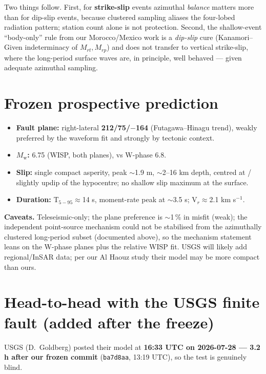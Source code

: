 \documentclass[11pt]{article}
\newcommand{\Mw}{$M_{\mathrm w}$}
\begin{document}
Two things follow. First, for \textbf{strike-slip} events azimuthal \emph{balance} matters more
than for dip-slip events, because clustered sampling aliases the four-lobed radiation pattern;
station count alone is not protection. Second, the shallow-event ``body-only'' rule from our
Morocco/Mexico work is a \emph{dip-slip} cure (Kanamori--Given indeterminacy of $M_{rt},M_{rp}$)
and does not transfer to vertical strike-slip, where the long-period surface waves are, in
principle, well behaved --- given adequate azimuthal sampling.

\section{Frozen prospective prediction}
\begin{itemize}
\item \textbf{Fault plane:} right-lateral \textbf{212/75/$-$164} (Futagawa--Hinagu trend), weakly
preferred by the waveform fit and strongly by tectonic context.
\item \textbf{\Mw:} 6.75 (WISP, both planes), vs W-phase 6.8.
\item \textbf{Slip:} single compact asperity, peak $\sim$1.9 m, $\sim$2--16 km depth, centred at /
slightly updip of the hypocentre; no shallow slip maximum at the surface.
\item \textbf{Duration:} T$_{5-95}\approx$14 s, moment-rate peak at $\sim$3.5 s; V$_r\approx$2.1
km s$^{-1}$.
\end{itemize}

\textbf{Caveats.} Teleseismic-only; the plane preference is $\sim$1\,\% in misfit (weak); the
independent point-source mechanism could not be stabilised from the azimuthally clustered
long-period subset (documented above), so the mechanism statement leans on the W-phase planes plus
the relative WISP fit. USGS will likely add regional/InSAR data; per our Al Haouz study their model
may be more compact than ours.

\section{Head-to-head with the USGS finite fault (added after the freeze)}
USGS (D.~Goldberg) posted their model at \textbf{16:33 UTC on 2026-07-28 --- 3.2 h after our
frozen commit} (\texttt{ba7d8aa}, 13:19 UTC), so the test is genuinely blind.
\end{document}
